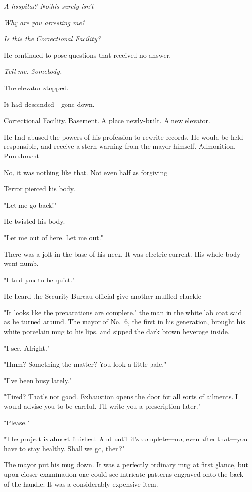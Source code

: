 \emph{A hospital? No\el this surely isn't---}

\emph{Why are you arresting me?}

\emph{Is this the Correctional Facility?}

He continued to pose questions that received no answer.

\emph{Tell me. Somebody.}

The elevator stopped.

It had descended---gone down.

Correctional Facility. Basement. A place newly-built. A new elevator.

He had abused the powers of his profession to rewrite records. He would
be held responsible, and receive a stern warning from the mayor himself.
Admonition. Punishment.

No, it was nothing like that. Not even half as forgiving.

Terror pierced his body.

"Let me go back!"

He twisted his body.

"Let me out of here. Let me out."

There was a jolt in the base of his neck. It was electric current. His
whole body went numb.

"I told you to be quiet."

He heard the Security Bureau official give another muffled chuckle.

\mybreak

"It looks like the preparations are complete," the man in the white lab
coat said as he turned around. The mayor of No.~6, the first in his
generation, brought his white porcelain mug to his lips, and sipped the
dark brown beverage inside.

"I see. Alright."

"Hmm? Something the matter? You look a little pale."

"I've been busy lately."

"Tired? That's not good. Exhaustion opens the door for all sorts of
ailments. I would advise you to be careful. I'll write you a
prescription later."

"Please."

"The project is almost finished. And until it's complete---no, even after
that---you have to stay healthy. Shall we go, then?"

The mayor put his mug down. It was a perfectly ordinary mug at first
glance, but upon closer examination one could see intricate patterns
engraved onto the back of the handle. It was a considerably expensive
item.

